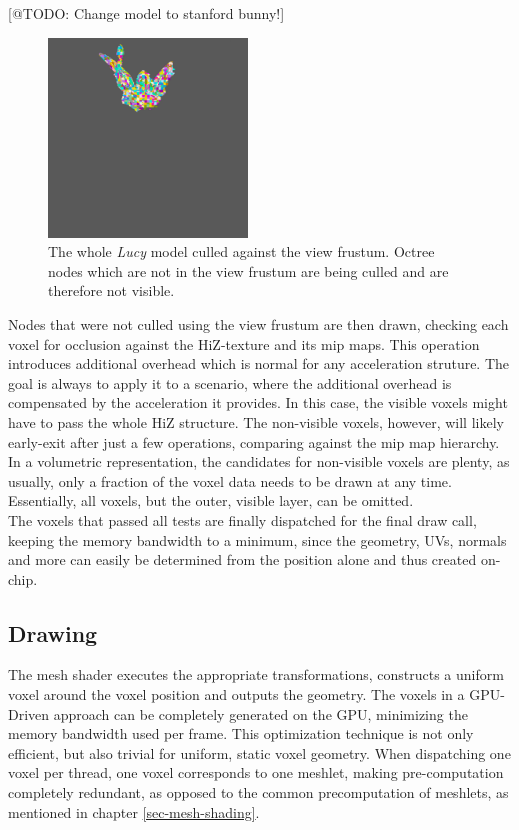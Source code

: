 [@TODO: Change model to stanford bunny!]
\begin{figure}[h]
    \centering
    \includegraphics[width=200px]{images/graphics/lucy-frustum-culling.jpg}
    \caption{The whole \emph{Lucy} model culled against the view frustum. Octree nodes which are not in the 
    view frustum are being culled and are therefore not visible.}
    \label{fig:lucy-frustum-culling}
\end{figure}

Nodes that were not culled using the view frustum are then drawn, checking each voxel for occlusion against the 
\ac{HiZ}-texture and its mip maps. This operation introduces additional overhead which is normal for any acceleration struture. 
The goal is always to apply it to a scenario, where the additional overhead is compensated by the acceleration it provides. 
In this case, the visible voxels might have to pass the whole \ac{HiZ} structure. The non-visible voxels, however, will likely 
early-exit after just a few operations, comparing against the mip map hierarchy. In a volumetric representation, the candidates 
for non-visible voxels are plenty, as usually, only a fraction of the voxel data needs to be drawn at any time. Essentially, 
all voxels, but the outer, visible layer, can be omitted.\\

\noindent
The voxels that passed all tests are finally dispatched for the final draw call, keeping the memory bandwidth to a minimum, 
since the geometry, UVs, normals and more can easily be determined from the position alone and thus created on-chip. \\


\subsection*{Drawing} \label{subsec-mesh-shader}

The mesh shader executes the appropriate transformations, constructs a uniform voxel around the voxel position 
and outputs the geometry. The voxels in a \ac{GPU}-Driven approach can be completely generated on the \ac{GPU}, 
minimizing the memory bandwidth used per frame. This optimization technique is not only efficient, but also 
trivial for uniform, static voxel geometry. When dispatching one voxel per thread, one voxel corresponds 
to one meshlet, making pre-computation completely redundant, as opposed to the common precomputation of meshlets, 
as mentioned in chapter \ref{sec-mesh-shading}.



